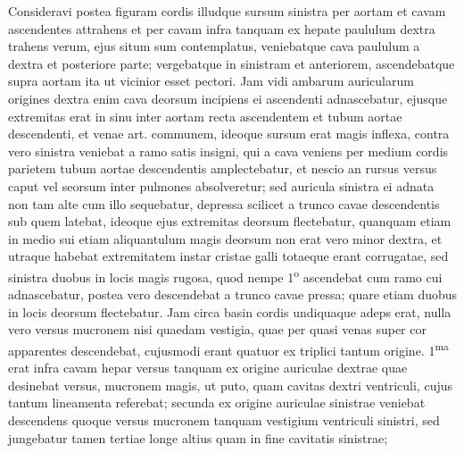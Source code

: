 \count{}
\count{}
\count{}
\pstart
Consideravi postea figuram cordis illudque sursum sinistra per aortam et cavam ascendentes attrahens et per cavam infra tanquam ex hepate paululum dextra trahens verum, ejus situm sum contemplatus, veniebatque cava paululum a dextra et posteriore parte; vergebatque in sinistram et anteriorem, ascendebatque supra aortam ita ut vicinior esset pectori.
Jam vidi ambarum auricularum origines dextra enim cava deorsum incipiens ei ascendenti adnascebatur, ejusque extremitas erat in sinu inter aortam recta ascendentem et tubum aortae descendenti, et venae art. communem, ideoque sursum erat magis inflexa, contra vero sinistra veniebat a ramo satis insigni, qui a cava veniens per medium cordis parietem tubum aortae descendentis amplectebatur, et nescio an rursus
 versus caput vel seorsum
inter pulmones absolveretur; sed auricula sinistra ei adnata non tam alte cum illo sequebatur, depressa scilicet a trunco cavae descendentis sub quem latebat, ideoque ejus extremitas deorsum flectebatur, quanquam etiam in medio sui etiam aliquantulum magis deorsum
non erat vero minor dextra, et utraque habebat extremitatem instar cristae galli totaeque erant corrugatae, sed sinistra duobus in locis magis rugosa, quod nempe 1\textsuperscript{o} ascendebat cum ramo cui adnascebatur, postea vero descendebat a trunco cavae pressa; quare etiam duobus in locis deorsum flectebatur.
\pend%
\pstart%
Jam circa\label{jamcirca} basin cordis undiquaque adeps erat, nulla vero versus mucronem nisi quaedam vestigia, quae per quasi venas super cor apparentes descendebat, cujusmodi erant quatuor ex triplici tantum origine. 1\textsuperscript{ma} erat infra cavam hepar versus tanquam ex origine auriculae dextrae quae desinebat versus, mucronem magis, ut puto, quam cavitas dextri ventriculi, cujus tantum lineamenta referebat; secunda ex origine auriculae sinistrae veniebat descendens quoque versus mucronem tanquam vestigium ventriculi sinistri, sed jungebatur tamen tertiae longe altius quam in fine cavitatis sinistrae;
